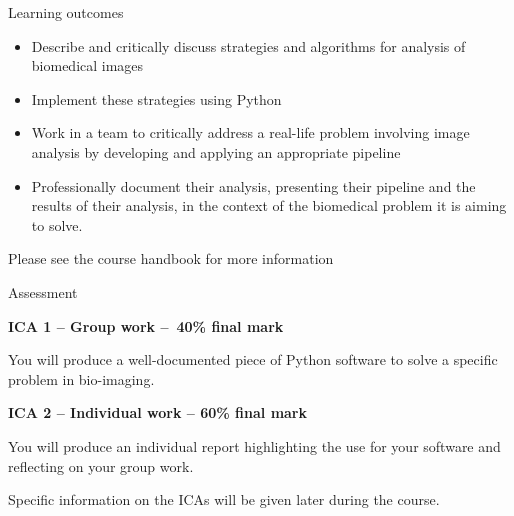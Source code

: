 \documentclass[9pt, aspectratio=169]{beamer}
\begin{document}
\begin{frame}
    {Learning outcomes}
    \begin{itemize}
        \item Describe and critically discuss strategies and algorithms for analysis of biomedical images
        \item Implement these strategies using Python
        \item Work in a team to critically address a real-life problem involving image analysis by developing and applying an appropriate pipeline
        \item Professionally document their analysis, presenting their pipeline and the results of their analysis, in the context of the biomedical problem it is aiming to solve.
    \end{itemize}
    \vspace{2em}
    Please see the course handbook for more information
\end{frame}

\begin{frame}
    {Assessment}

    \textbf{ICA 1 – Group work – 40\% final mark}

    You will produce a well-documented piece of Python software to solve a specific problem in bio-imaging.

    \textbf{ICA 2 – Individual work – 60\% final mark}

    You will produce an individual report highlighting the use for your software and reflecting on your group work.

    \vspace{2em}
    Specific information on the ICAs will be given later during the course.
\end{frame}
\end{document}
